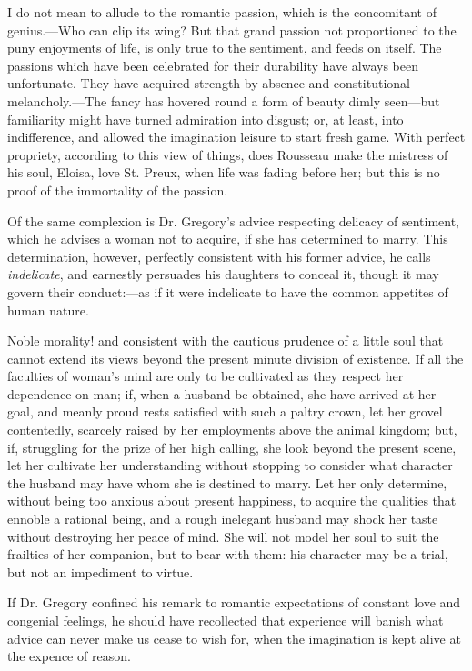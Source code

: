 I do not mean to allude to the romantic passion, which is the
concomitant of genius.---Who can clip its wing? But that grand passion
not proportioned to the puny enjoyments of life, is only true to the
sentiment, and feeds on itself. The passions which have been
celebrated for their durability have always been unfortunate. They
have acquired strength by absence and constitutional melancholy.---The
fancy has hovered round a form of beauty dimly seen---but familiarity
might have turned admiration into disgust; or, at least, into
indifference, and allowed the imagination leisure to start fresh
game. With perfect propriety, according to this view of things, does
Rousseau make the mistress of his soul, Eloisa, love St. Preux, when
life was fading before her; but this is no proof of the immortality of
the passion.

Of the same complexion is Dr. Gregory's advice respecting delicacy of
sentiment, which he advises a woman not to acquire, if she has
determined to marry. This determination,  however, perfectly
consistent with his former advice, he calls \textit{indelicate}, and
earnestly persuades his daughters to conceal it, though it may govern
their conduct:---as if it were indelicate to have the common appetites
of human nature.

Noble morality! and consistent with the cautious prudence of a little
soul that cannot extend its views beyond the present minute division
of existence. If all the faculties of woman's mind are only to be
cultivated as they respect her dependence on man; if, when a husband
be obtained, she have arrived at her goal, and meanly proud rests
satisfied with such a paltry crown, let her grovel contentedly,
scarcely raised by her employments above the animal kingdom; but, if,
struggling for the prize of her high calling, she look beyond the
present scene, let her cultivate her understanding without stopping to
consider what character the husband may have whom she is destined to
marry. Let her only determine, without being too anxious about present
happiness, to acquire the qualities that ennoble a rational being, and
a rough inelegant husband may shock her taste without destroying her
peace of mind. She will not model her soul to suit  the
frailties of her companion, but to bear with them: his character may
be a trial, but not an impediment to virtue.

If Dr. Gregory confined his remark to romantic expectations of
constant love and congenial feelings, he should have recollected that
experience will banish what advice can never make us cease to wish
for, when the imagination is kept alive at the expence of reason.

